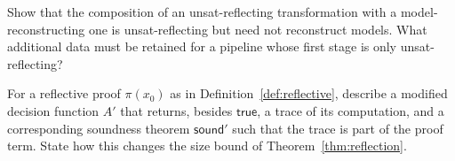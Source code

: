 \begin{exercise}
Show that the composition of an unsat-reflecting transformation with a model-reconstructing one is unsat-reflecting but need not reconstruct models. What additional data must be retained for a pipeline whose first stage is only unsat-reflecting?
\end{exercise}

\begin{exercise}
For a reflective proof $\pi(x_0)$ as in Definition~\ref{def:reflective}, describe a modified decision function $A'$ that returns, besides $\mathsf{true}$, a trace of its computation, and a corresponding soundness theorem $\mathsf{sound}'$ such that the trace is part of the proof term. State how this changes the size bound of Theorem~\ref{thm:reflection}.
\end{exercise}
